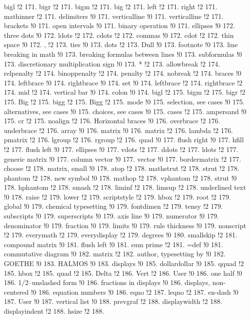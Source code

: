bigl !2 171.
bigr !2 171.
bigm !2 171.
big !2 171.
left !2 171.
right !2 171.
mathinner !2 171.
delimiters !0 171.
verticalline !0 171.
verticalline !2 171.
brackets !0 171.
open intervals !0 171.
binary operation !0 171.
ellipses !0 172.
three dots !0 172.
ldots !2 172.
cdots !2 172.
commas !0 172.
cdot !2 172.
thin space !0 172.
, !2 173.
ties !0 173.
dots !2 173.
Dull !0 173.
footnote !0 173.
line breaking in math !0 173.
breaking formulas between lines !0 173.
subformulas !0 173.
discretionary multiplication sign !0 173.
* !2 173.
allowbreak !2 174.
relpenalty !2 174.
binoppenalty !2 174.
penalty !2 174.
nobreak !2 174.
braces !0 174.
leftbrace !0 174.
rightbrace !0 174.
set !0 174.
leftbrace !2 174.
rightbrace !2 174.
mid !2 174.
vertical bar !0 174.
colon !0 174.
bigl !2 175.
bigm !2 175.
bigr !2 175.
Big !2 175.
bigg !2 175.
Bigg !2 175.
mode !0 175.
selection, see cases !0 175.
alternatives, see cases !0 175.
choices, see cases !0 175.
cases !2 175.
ampersand !0 175.
cr !2 175.
noalign !2 176.
Horizontal braces !0 176.
overbrace !2 176.
underbrace !2 176.
array !0 176.
matrix !0 176.
matrix !2 176.
lambda !2 176.
pmatrix !2 176.
lgroup !2 176.
rgroup !2 176.
quad !0 177.
flush right !0 177.
hfill !2 177.
flush left !0 177.
ellipses !0 177.
vdots !2 177.
ddots !2 177.
ldots !2 177.
generic matrix !0 177.
column vector !0 177.
vector !0 177.
bordermatrix !2 177.
choose !2 178.
matrix, small !0 178.
atop !2 178.
mathstrut !2 178.
strut !2 178.
phantom !2 178.
new symbol !0 178.
mathop !2 178.
vphantom !2 178.
strut !0 178.
hphantom !2 178.
smash !2 178.
liminf !2 178.
limsup !2 178.
underlined text !0 178.
raise !2 179.
lower !2 179.
scriptstyle !2 179.
hbox !2 179.
root !2 179.
global !0 179.
chemical typesetting !0 179.
fontdimen !2 179.
tensy !2 179.
subscripts !0 179.
superscripts !0 179.
axis line !0 179.
numerator !0 179.
denominator !0 179.
fraction !0 179.
limits !0 179.
rule thickness !0 179.
nonscript !2 179.
everymath !2 179.
everydisplay !2 179.
degrees !0 180.
smallskip !2 181.
compound matrix !0 181.
flush left !0 181.
sum prime !2 181.
=def !0 181.
commutative diagram !0 182.
matrix !2 182.
author, typesetting by !0 182.
GOETHE !0 183.
HALMOS !0 183.
displays !0 185.
dollardollar !0 185.
qquad !2 185.
hbox !2 185.
quad !2 185.
Delta !2 186.
Vert !2 186.
User !0 186.
one half !0 186.
1/2--unslashed form !0 186.
fractions in displays !0 186.
displays, non-centered !0 186.
equation numbers !0 186.
eqno !2 187.
leqno !2 187.
en-dash !0 187.
User !0 187.
vertical list !0 188.
prevgraf !2 188.
displaywidth !2 188.
displayindent !2 188.
hsize !2 188.
